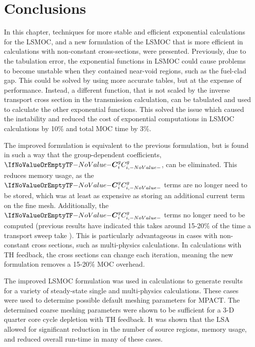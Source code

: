 {  \section{Conclusions}{\label{sec:LSMOC:Conclusions}
    In this chapter, techniques for more stable and efficient exponential calculations for the \ac{LSMOC}, and a new formulation of the \ac{LSMOC} that is more efficient in calculations with non-constant cross-sections, were presented.
    Previously, due to the tabulation error, the exponential functions in \ac{LSMOC} could cause problems to become unstable when they contained near-void regions, such as the fuel-clad gap.
    This could be solved by using more accurate tables, but at the expense of performance.
    Instead, a different function, that is not scaled by the inverse transport cross section in the transmission calculation, can be tabulated and used to calculate the other exponential functions.
    This solved the issue which caused the instability and reduced the cost of exponential computations in \ac{LSMOC} calculations by 10\% and total \ac{MOC} time by 3\%.

    The improved formulation is equivalent to the previous formulation, but is found in such a way that the group-dependent coefficients, $\C$, can be eliminated.
    This reduces memory usage, as the $\C$ terms are no longer need to be stored, which was at least as expensive as storing an additional current term on the fine mesh.
    Additionally, the $\C$ terms no longer need to be computed (previous results have indicated this takes around 15-20\% of the time a transport sweep take \cite{Fitzgerald2019}).
    This is particularly advantageous in cases with non-constant cross sections, such as multi-physics calculations.
    In calculations with \ac{TH} feedback, the cross sections can change each iteration, meaning the new formulation removes a 15-20\% \ac{MOC} overhead.

    The improved \ac{LSMOC} formulation was used in calculations to generate results for a variety of steady-state single and multi-physics calculations.
    These cases were used to determine possible default meshing parameters for MPACT.
    The determined coarse meshing parameters were shown to be sufficient for a 3-D quarter core cycle depletion with \ac{TH} feedback.
    It was shown that the \ac{LSA} allowed for significant reduction in the number of source regions, memory usage, and reduced overall run-time in many of these cases.

}}
